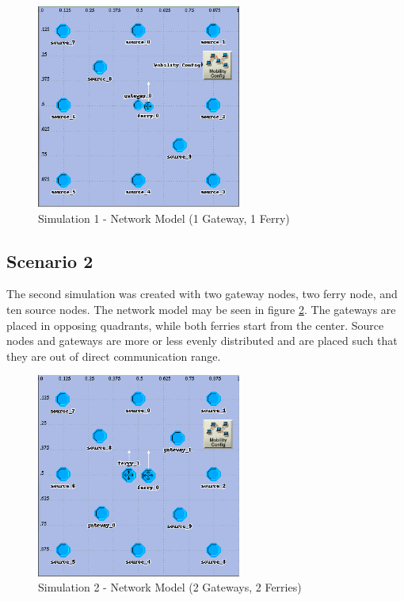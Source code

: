 \begin{figure}[ht]
    \centering
    \includegraphics[width=0.6\textwidth]{images/scenario2-top}
    \caption{Simulation 1 - Network Model (1 Gateway, 1 Ferry)}
    \label{fig:scenario2}
\end{figure}

\subsection{Scenario 2}		%

The second simulation was created with two gateway nodes, two ferry node, and ten source nodes.
The network model may be seen in figure \ref{fig:scenario3}.
The gateways are placed in opposing quadrants, while both ferries start from the center.
Source nodes and gateways are more or less evenly distributed and are placed such that they are out of direct communication range.

\begin{figure}[ht]
    \centering
    \includegraphics[width=0.6\textwidth]{images/scenario3-top}
    \caption{Simulation 2 - Network Model (2 Gateways, 2 Ferries)}
    \label{fig:scenario3}
\end{figure}

